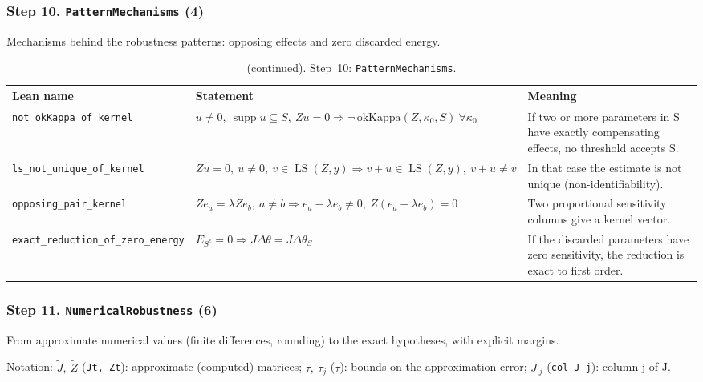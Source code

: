 \subsubsection*{Step 10. \texttt{PatternMechanisms} (4)}
Mechanisms behind the robustness patterns: opposing effects and zero discarded energy.

\addtocounter{table}{-1}
{\small
\begin{longtable}{@{}>{\raggedright\arraybackslash}p{3.6cm}>{\raggedright\arraybackslash}p{6.6cm}>{\raggedright\arraybackslash}p{5.6cm}@{}}
\caption[]{(continued). Step~10: \texttt{PatternMechanisms}.}\\
\toprule
Lean name & Statement & Meaning \\
\midrule
\endhead
\texttt{not\_\allowbreak{}okKappa\_\allowbreak{}of\_\allowbreak{}kernel} & $\displaystyle u\ne0,\ \operatorname{supp}u\subseteq S,\ Zu=0\Rightarrow\neg\,\mathrm{okKappa}(Z,\kappa_0,S)\ \forall\kappa_0$ & If two or more parameters in S have exactly compensating effects, no threshold accepts S. \\[3pt]
\texttt{ls\_\allowbreak{}not\_\allowbreak{}unique\_\allowbreak{}of\_\allowbreak{}kernel} & $\displaystyle Zu=0,\ u\ne0,\ v\in\operatorname{LS}(Z,y)\Rightarrow v+u\in\operatorname{LS}(Z,y),\ v+u\ne v$ & In that case the estimate is not unique (non-identifiability). \\[3pt]
\texttt{opposing\_\allowbreak{}pair\_\allowbreak{}kernel} & $\displaystyle Ze_a=\lambda Ze_b,\ a\ne b\Rightarrow e_a-\lambda e_b\ne0,\ Z(e_a-\lambda e_b)=0$ & Two proportional sensitivity columns give a kernel vector. \\[3pt]
\texttt{exact\_\allowbreak{}reduction\_\allowbreak{}of\_\allowbreak{}zero\_\allowbreak{}energy} & $\displaystyle E_{S^c}=0\Rightarrow J\Delta\theta=J\Delta\theta_S$ & If the discarded parameters have zero sensitivity, the reduction is exact to first order. \\[3pt]
\bottomrule
\end{longtable}
}

\subsubsection*{Step 11. \texttt{NumericalRobustness} (6)}
From approximate numerical values (finite differences, rounding) to the exact hypotheses, with explicit margins.

{\small\raggedright Notation: $\tilde J,\ \tilde Z$ (\texttt{Jt, Zt}): approximate (computed) matrices; $\tau,\ \tau_j$ (\texttt{$\tau$}): bounds on the approximation error; $J_{\cdot j}$ (\texttt{col J j}): column j of J.}

